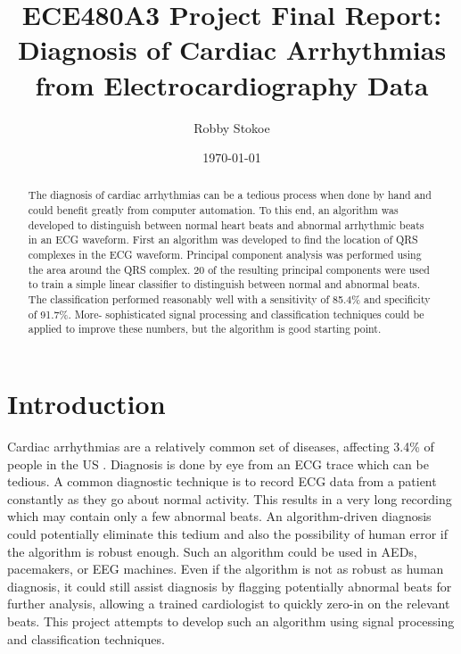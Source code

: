 \documentclass[12pt,letter]{article}
\title{ECE480A3 Project Final Report: \\ Diagnosis of Cardiac Arrhythmias from 
Electrocardiography Data}
\author{Robby Stokoe}
\date{\today}
\begin{document}
\maketitle

\begin{abstract}
    The diagnosis of cardiac arrhythmias can be a tedious process when done by
    hand and could benefit greatly from computer automation.  To this end, an
    algorithm was developed to distinguish between normal heart beats and
    abnormal arrhythmic beats in an ECG waveform.  First an algorithm was
    developed to find the location of QRS complexes in the ECG waveform.
    Principal component analysis was performed using the area around the QRS
    complex.  20 of the resulting principal components were used to train a
    simple linear classifier to distinguish between normal and abnormal beats.
    The classification performed reasonably well with a sensitivity of 85.4\%
    and specificity of 91.7\%. More- sophisticated signal processing and
    classification techniques could be applied to improve these numbers, but the
    algorithm is good starting point.  
\end{abstract}

\section{Introduction} 
Cardiac arrhythmias are a relatively common set of diseases, affecting 3.4\% of
people in the US \cite{cdc95}.  Diagnosis is done by eye from an ECG trace which
can be tedious.  A common diagnostic technique is to record ECG data from a
patient constantly as they go about normal activity.  This results in a very
long recording which may contain only a few abnormal beats.  An algorithm-driven
diagnosis could potentially eliminate this tedium and also the possibility of
human error if the algorithm is robust enough.  Such an algorithm could be used
in AEDs, pacemakers, or EEG machines.  Even if the algorithm is not as robust as
human diagnosis, it could still assist diagnosis by flagging potentially
abnormal beats for further analysis, allowing a trained cardiologist to quickly
zero-in on the relevant beats.  This project attempts to develop such an
algorithm using signal processing and classification techniques.  
\end{document}
